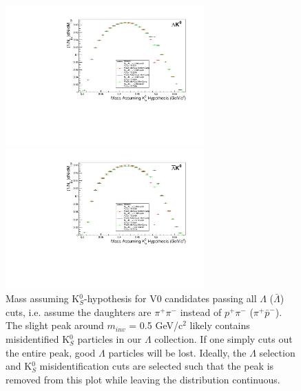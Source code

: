 \begin{figure}[h]
\begin{minipage}{18pc}
\includegraphics[width=18pc]{3_DataSelection/Figures/MassAssHypotheses/canMassAssK0HypCompare_LamK0_wNoMisID.pdf}
\end{minipage}\hspace{2pc}
\begin{minipage}{18pc}
\includegraphics[width=18pc]{3_DataSelection/Figures/MassAssHypotheses/canMassAssK0HypCompare_ALamK0_wNoMisID.pdf}
\end{minipage} 
\caption[K$^{0}_{S}$ contamination in $\Lambda$($\bar{\Lambda}$) collection]{Mass assuming K$^{0}_{S}$-hypothesis for V0 candidates passing all $\Lambda$ ($\bar{\Lambda}$) cuts, i.e. assume the daughters are $\pi^{+}\pi^{-}$ instead of $p^{+}\pi^{-}$ ($\pi^{+}\bar{p}^{-}$).  The slight peak around $m_{inv}$ = 0.5 GeV/c$^{2}$ likely contains misidentified K$^{0}_{S}$ particles in our $\Lambda$ collection.  If one simply cuts out the entire peak, good $\Lambda$ particles will be lost.  Ideally, the $\Lambda$ selection and K$^{0}_{S}$ misidentification cuts are selected such that the peak is removed from this plot while leaving the distribution continuous.}
  \label{fig:MassAssK0ShortHyp_cLamK0}
\end{figure}

